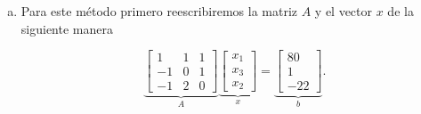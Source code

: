 \begin{frame}
	\begin{solution}
		\begin{enumerate}[b)]
			\item
			      Para este método primero reescribiremos la matriz $A$ y
			      el vector $x$ de la siguiente manera

			      \begin{equation*}
				      \underbrace{
					      \begin{bmatrix}
						      1  & 1 & 1 \\
						      -1 & 0 & 1 \\
						      -1 & 2 & 0
					      \end{bmatrix}
				      }_{\displaystyle A}
				      \underbrace{
					      \begin{bmatrix}
						      x_{1} \\
						      x_{3} \\
						      x_{2}
					      \end{bmatrix}
				      }_{\displaystyle x}
				      =
				      \underbrace{
					      \begin{bmatrix}
						      80 \\
						      1  \\
						      -22
					      \end{bmatrix}
				      }_{\displaystyle b}.
			      \end{equation*}


\end{enumerate}
\end{solution}
\end{frame}
